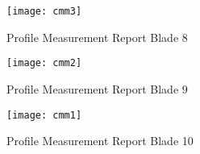 \begin{figure}[H]
    \centering
    \texttt{[image: cmm3]}
    \caption{Profile Measurement Report Blade 8}
    \label{fig:cmm3}
\end{figure}

\begin{figure}[H]
    \centering
    \texttt{[image: cmm2]}
    \caption{Profile Measurement Report Blade 9}
    \label{fig:cmm2}
\end{figure}

\begin{figure}[H]
    \centering
    \texttt{[image: cmm1]}
    \caption{Profile Measurement Report Blade 10}
    \label{fig:cmm1}
\end{figure}

\newcommand{\showcasecoversize}{0.3\textwidth}
\newcommand*{\myhfill}{}
\newcommand{\myincludeimage}[1]{%
    \myhfill%
    \defifundef{\mycvbox}{\newsavebox}%
    \savebox{\mycvbox}{\texttt{[image: \#1]}}%
    \defifundef{\mycvboxht}{\newlength}%
    \setlength{\mycvboxht}{\dimexpr \showcasecoversize*\paperheight/\paperwidth}%
    \rule{0pt}{1.1\mycvboxht}%
    \setlength{\fboxsep}{0pt}%
    \fbox{\texttt{[image: \#1]}}%
    \renewcommand*{\myhfill}{\hfill}%
}

